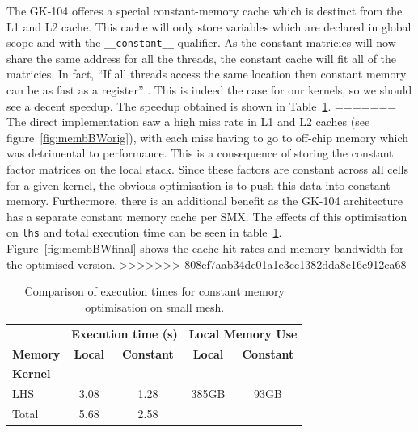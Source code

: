 \documentclass[11pt, oneside, a4paper]{article}
\begin{document}
The GK-104 offeres a special constant-memory cache which is destinct from the L1 and L2 cache. This cache will only store variables which are declared in global scope and with the \verb.__constant__. qualifier.
As the constant matricies will now share the same address for all the threads, the constant cache will fit all of the matricies.
In fact, ``If all threads access the same location then constant memory can be as fast as a register'' \cite{Best Practices}.
This is indeed the case for our kernels, so we should see a decent speedup.
The speedup obtained is shown in Table~\ref{tab:constMemExeTime}.
=======
The direct implementation saw a high miss rate in L1 and L2 caches (see figure~\ref{fig:membBWorig}), with each miss having to go to off-chip memory which was detrimental to performance. This is a consequence of storing the constant factor matrices on the local stack. Since these factors are constant across all cells for a given kernel, the obvious optimisation is to push this data into constant memory. Furthermore, there is an additional benefit as the GK-104 architecture has a separate constant memory cache per SMX. The effects of this optimisation on \texttt{lhs} and total execution time can be seen in table~\ref{tab:constMemExeTime}. Figure~\ref{fig:membBWfinal} shows the cache hit rates and memory bandwidth for the optimised version.
>>>>>>> 808ef7aab34de01a1e3ce1382dda8e16e912ca68

\begin{table}[tb]
	\caption{Comparison of execution times for constant memory optimisation on small mesh.}
	\label{tab:constMemExeTime}
	\begin{center}
		\begin{tabular}{l|cc|cc}
		\hline

		\hline

		& \multicolumn{2}{c|}{\textbf{Execution time (s)}} & \multicolumn{2}{c}{\textbf{Local Memory Use}} \\
		\textbf{Memory} & \textbf{Local} & \textbf{Constant} & \textbf{Local} & \textbf{Constant} \\
		\hline
			\textbf{Kernel} &&&&\\
			LHS 	& 3.08 	& 1.28 & 385GB & 93GB \\
			Total 	& 5.68 	& 2.58 \\
		\hline

		\hline
		\end{tabular}
	\end{center}
\end{table}
\end{document}
